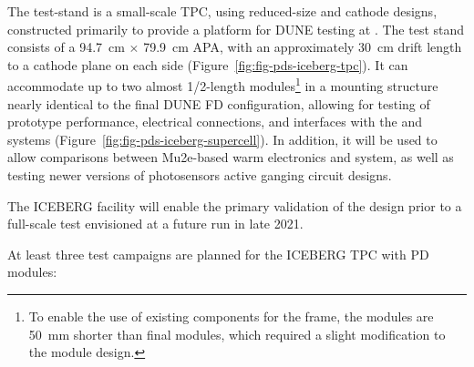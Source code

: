 The  test-stand is a small-scale TPC, using reduced-size   and cathode designs, constructed primarily to provide a platform for DUNE  testing at . 
The test stand consists of a \SI{94.7}{cm} $\times$ \SI{79.9}{cm} APA, with an approximately \SI{30}{cm} drift length to a cathode plane on each side (Figure~\ref{fig:fig-pds-iceberg-tpc}).  
It can accommodate up to two almost 1/2-length  modules\footnote{To enable the use of existing components for the  frame, the  modules are \SI{50}{mm} shorter than final modules, which required a slight modification to the  module design.} in a mounting structure nearly identical to the final DUNE FD configuration, allowing for testing of  prototype performance, electrical connections, and interfaces with the  and  systems (Figure~\ref{fig:fig-pds-iceberg-supercell}). 
In addition, it will be used to allow comparisons between Mu2e-based warm electronics and   system, as well as testing newer versions of photosensors active ganging circuit designs.


The ICEBERG facility will enable the primary validation of the  design prior to a full-scale test envisioned at a future  run in late 2021. 

At least three test campaigns are planned for the ICEBERG TPC with PD modules:  

